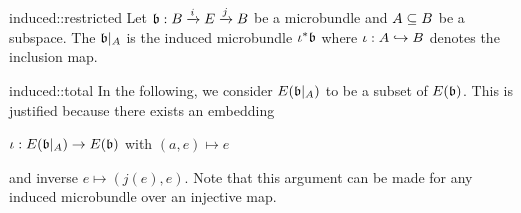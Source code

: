 \begin{myexample}{induced::restricted}{}    
    Let $\bundledef{\bb}{B}{E}{i}{j}$ be a microbundle and $A \sub B$ be a subspace.
    The  $\bb\restr{A}$ is the induced microbundle $\ind{\iota}\bb$
    where $\iota: A \incl B$ denotes the inclusion map.
\end{myexample}

\begin{myremark}{induced::total}{}
    In the following, we consider $E(\bb\restr{A})$ to be a subset of $E(\bb)$.
    This is justified because there exists an embedding
    \begin{center}
        $\iota: E(\bb\restr{A}) \to E(\bb)$ with $(a, e) \mapsto e$
    \end{center}
    and inverse $e \mapsto (j(e), e)$.
    Note that this argument can be made for any induced microbundle over an injective map.
\end{myremark}